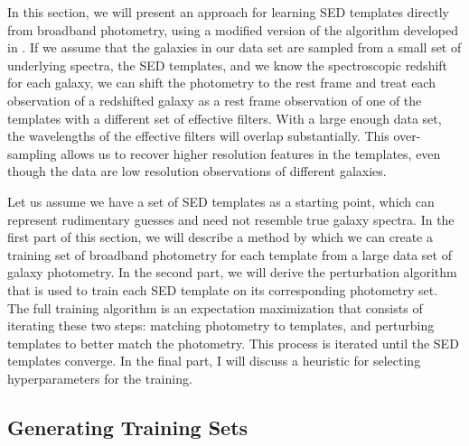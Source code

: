 
\label{sect:template_training}

In this section, we will present an approach for learning SED templates directly from broadband photometry, using a modified version of the algorithm developed in \citet{Budavari2000b}. 
If we assume that the galaxies in our data set are sampled from a small set of underlying spectra, the SED templates, and we know the spectroscopic redshift for each galaxy, we can shift the photometry to the rest frame and treat each observation of a redshifted galaxy as a rest frame observation of one of the templates with a different set of effective filters. 
With a large enough data set, the wavelengths of the effective filters will overlap substantially. 
This over-sampling allows us to recover higher resolution features in the templates, even though the data are low resolution observations of different galaxies.

Let us assume we have a set of SED templates as a starting point, which can represent rudimentary guesses and need not resemble true galaxy spectra. 
In the first part of this section, we will describe a method by which we can create a training set of broadband photometry for each template from a large data set of galaxy photometry. 
In the second part, we will derive the perturbation algorithm that is used to train each SED template on its corresponding photometry set. 
The full training algorithm is an expectation maximization that consists of iterating these two steps: matching photometry to templates, and perturbing templates to better match the photometry.
This process is iterated until the SED templates converge. 
In the final part, I will discuss a heuristic for selecting hyperparameters for the training.





\subsection{Generating Training Sets}
\label{sect:training_sets}
        
